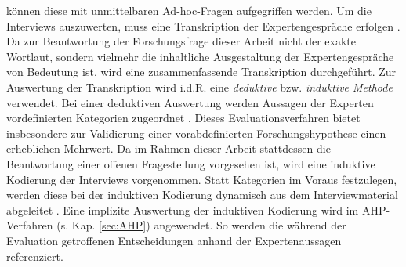 können diese mit unmittelbaren Ad-hoc-Fragen aufgegriffen werden. Um die Interviews auszuwerten, muss eine Transkription der Expertengespräche erfolgen \cite[179]{Aghamanoukjan.2009}. Da zur Beantwortung der Forschungsfrage dieser Arbeit nicht der exakte Wortlaut, sondern vielmehr die inhaltliche Ausgestaltung der Expertengespräche von Bedeutung ist, wird eine zusammenfassende Transkription durchgeführt. Zur Auswertung der Transkription wird i.d.R. eine \textit{deduktive} bzw. \textit{induktive Methode} verwendet. Bei einer deduktiven Auswertung werden Aussagen der Experten vordefinierten Kategorien zugeordnet \cite[663]{Aghamanoukjan.2009}. Dieses Evaluationsverfahren bietet insbesondere zur Validierung einer vorabdefinierten Forschungshypothese einen erheblichen Mehrwert. Da im Rahmen dieser Arbeit stattdessen die Beantwortung einer offenen Fragestellung vorgesehen ist, wird eine induktive Kodierung der Interviews vorgenommen. Statt Kategorien im Voraus festzulegen, werden diese bei der induktiven Kodierung dynamisch aus dem Interviewmaterial abgeleitet \cite[663]{Aghamanoukjan.2009}. Eine implizite Auswertung der induktiven Kodierung wird im AHP-Verfahren (s. Kap. \ref{sec:AHP}) angewendet. So werden die während der Evaluation getroffenen Entscheidungen anhand der Expertenaussagen referenziert.

